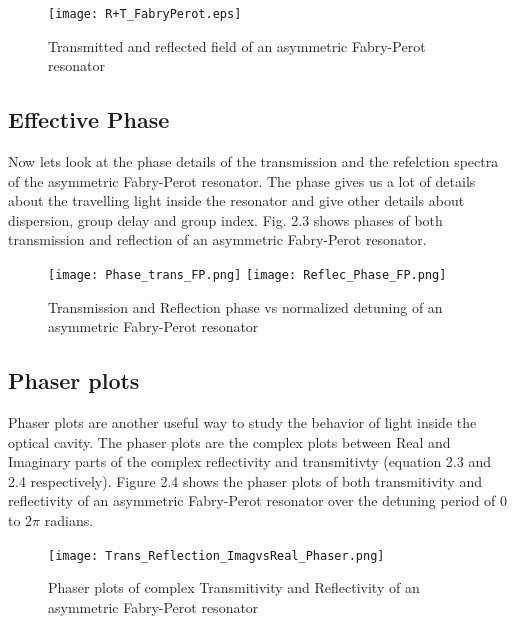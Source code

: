 \begin{figure}[h]
\centering
\texttt{[image: R+T\_FabryPerot.eps]}
\caption{Transmitted and reflected field of an asymmetric Fabry-Perot resonator}
\end{figure}

\newpage

\subsection{Effective Phase}
Now lets look at the phase details of the transmission and the refelction spectra of the asymmetric Fabry-Perot resonator. The phase gives us a lot of details about the travelling light inside the resonator and give other details about dispersion, group delay and group index. Fig. 2.3 shows phases of both transmission and reflection of an asymmetric Fabry-Perot resonator.

\begin{figure}[h]
\texttt{[image: Phase\_trans\_FP.png]}
\texttt{[image: Reflec\_Phase\_FP.png]}
\caption{Transmission and Reflection phase vs normalized detuning of an asymmetric Fabry-Perot resonator}
\end{figure}

\subsection{Phaser plots}
Phaser plots are another useful way to study the behavior of light inside the optical cavity. The phaser plots are the complex plots between Real and Imaginary parts of the complex reflectivity and transmitivty (equation 2.3 and 2.4 respectively). Figure 2.4 shows the phaser plots of both transmitivity and reflectivity of an asymmetric Fabry-Perot resonator over the detuning period of 0 to $2\pi$ radians. 

\begin{figure}[h]
\centering
\texttt{[image: Trans\_Reflection\_ImagvsReal\_Phaser.png]}
\caption{Phaser plots of complex Transmitivity and Reflectivity of an asymmetric Fabry-Perot resonator}
\end{figure}

\newpage

